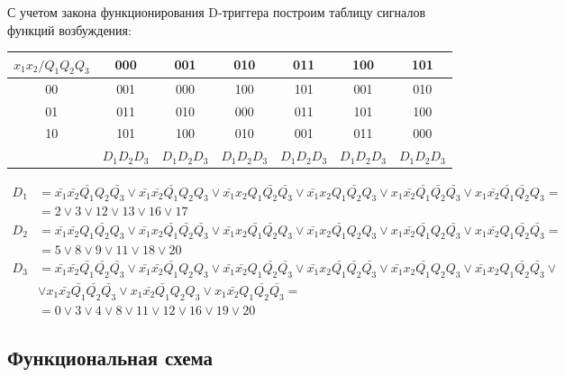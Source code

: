 \documentclass[listings]{labreport}
\begin{document}
С учетом закона функционирования D-триггера построим таблицу
сигналов функций возбуждения:

\begin{tabular}{|*{7}{c|}}
\hline
$x_1x_2/Q_1Q_2Q_3$ & 000 & 001 & 010 & 011 & 100 & 101\\\hline
00 & 001 & 000 & 100 & 101 & 001 & 010\\\hline
01 & 011 & 010 & 000 & 011 & 101 & 100\\\hline
10 & 101 & 100 & 010 & 001 & 011 & 000\\\hline
 & $D_1D_2D_3$ & $D_1D_2D_3$ & $D_1D_2D_3$ & $D_1D_2D_3$ & $D_1D_2D_3$ & $D_1D_2D_3$\\\hline
\end{tabular}

\begin{align*}
D_1 & = \bar{x_1}\bar{x_2}\bar{Q_1}Q_2\bar{Q_3} \lor \bar{x_1}\bar{x_2}\bar{Q_1}Q_2Q_3 \lor \bar{x_1}x_2Q_1\bar{Q_2}\bar{Q_3} \lor \bar{x_1}x_2Q_1\bar{Q_2}Q_3 \lor x_1\bar{x_2}\bar{Q_1}\bar{Q_2}\bar{Q_3} \lor x_1\bar{x_2}\bar{Q_1}\bar{Q_2}Q_3 = \\ & = 2 \lor 3 \lor 12 \lor 13 \lor 16 \lor 17 \\
D_2 & = \bar{x_1}\bar{x_2}Q_1\bar{Q_2}Q_3 \lor \bar{x_1}x_2\bar{Q_1}\bar{Q_2}\bar{Q_3} \lor \bar{x_1}x_2\bar{Q_1}\bar{Q_2}Q_3 \lor \bar{x_1}x_2\bar{Q_1}Q_2Q_3 \lor x_1\bar{x_2}\bar{Q_1}Q_2\bar{Q_3} \lor x_1\bar{x_2}Q_1\bar{Q_2}\bar{Q_3}       = \\ & = 5 \lor 8 \lor 9 \lor 11 \lor 18 \lor 20 \\
D_3 & = \bar{x_1}\bar{x_2}\bar{Q_1}\bar{Q_2}\bar{Q_3} \lor \bar{x_1}\bar{x_2}\bar{Q_1}Q_2Q_3 \lor \bar{x_1}\bar{x_2}Q_1\bar{Q_2}\bar{Q_3} \lor \bar{x_1}x_2\bar{Q_1}\bar{Q_2}\bar{Q_3} \lor \bar{x_1}x_2\bar{Q_1}Q_2Q_3 \lor \bar{x_1}x_2Q_1\bar{Q_2}\bar{Q_3} \lor \\ & \lor x_1\bar{x_2}\bar{Q_1}\bar{Q_2}\bar{Q_3} \lor x_1\bar{x_2}\bar{Q_1}Q_2Q_3 \lor x_1\bar{x_2}Q_1\bar{Q_2}\bar{Q_3} = \\ & = 0 \lor 3 \lor 4 \lor 8 \lor 11 \lor 12 \lor 16 \lor 19 \lor 20
\end{align*}

\subsection*{Функциональная схема}
\end{document}
